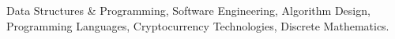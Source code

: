 

\begin{cvparagraph}

Data Structures \& Programming, Software Engineering, Algorithm Design, Programming Languages, Cryptocurrency Technologies, Discrete Mathematics.
\end{cvparagraph}
